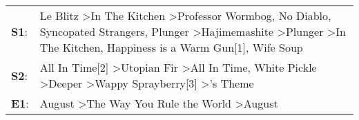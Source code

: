 \begin{supertabular}{p{0.03\textwidth}p{0.92\textwidth}}
 \textbf{S1}:  &  Le Blitz\textsuperscript{} \textgreater \enspace In The Kitchen\textsuperscript{} \textgreater \enspace Professor Wormbog\textsuperscript{}, \enspace No Diablo\textsuperscript{}, \enspace Syncopated Strangers\textsuperscript{}, \enspace Plunger\textsuperscript{} \textgreater \enspace Hajimemashite\textsuperscript{} \textgreater \enspace Plunger\textsuperscript{} \textgreater \enspace In The Kitchen\textsuperscript{}, \enspace Happiness is a Warm Gun[1]\textsuperscript{}, \enspace Wife Soup\textsuperscript{}  \enspace  \\
 \textbf{S2}:  &                                                                                                                                                                                   All In Time[2]\textsuperscript{} \textgreater \enspace Utopian Fir\textsuperscript{} \textgreater \enspace All In Time\textsuperscript{}, \enspace White Pickle\textsuperscript{} \textgreater \enspace Deeper\textsuperscript{} \textgreater \enspace Wappy Sprayberry[3]\textsuperscript{} \textgreater {}'s Theme\textsuperscript{}  \enspace  \\
 \textbf{E1}:  &                                                                                                                                                                                                                                                                                                                                                                                        August\textsuperscript{} \textgreater \enspace The Way You Rule the World\textsuperscript{} \textgreater \enspace August\textsuperscript{}  \enspace  \\
\end{supertabular}
